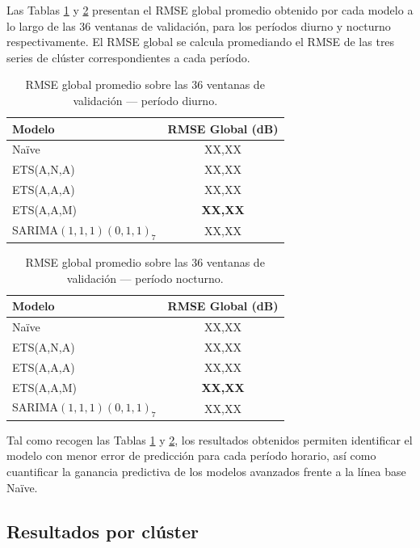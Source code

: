 Las Tablas \ref{tab:rmse_global_day} y \ref{tab:rmse_global_night} presentan el RMSE global promedio obtenido por cada modelo a lo largo de las 36 ventanas de validación, para los períodos diurno y nocturno respectivamente. El RMSE global se calcula promediando el RMSE de las tres series de clúster correspondientes a cada período.

\begin{table}[H]
\centering
\caption{RMSE global promedio sobre las 36 ventanas de validación — período diurno.}
\label{tab:rmse_global_day}
\begin{tabular}{lc}
\toprule
Modelo & RMSE Global (dB) \\
\midrule
Naïve                            & XX{,}XX \\
ETS(A,N,A)                       & XX{,}XX \\
ETS(A,A,A)                       & XX{,}XX \\
ETS(A,A,M)                       & \textbf{XX{,}XX} \\
SARIMA$(1,1,1)(0,1,1)_7$         & XX{,}XX \\
\bottomrule
\end{tabular}
\end{table}

\begin{table}[H]
\centering
\caption{RMSE global promedio sobre las 36 ventanas de validación — período nocturno.}
\label{tab:rmse_global_night}
\begin{tabular}{lc}
\toprule
Modelo & RMSE Global (dB) \\
\midrule
Naïve                            & XX{,}XX \\
ETS(A,N,A)                       & XX{,}XX \\
ETS(A,A,A)                       & XX{,}XX \\
ETS(A,A,M)                       & \textbf{XX{,}XX} \\
SARIMA$(1,1,1)(0,1,1)_7$         & XX{,}XX \\
\bottomrule
\end{tabular}
\end{table}

Tal como recogen las Tablas \ref{tab:rmse_global_day} y \ref{tab:rmse_global_night}, los resultados obtenidos permiten identificar el modelo con menor error de predicción para cada período horario, así como cuantificar la ganancia predictiva de los modelos avanzados frente a la línea base Naïve.

\subsection{Resultados por clúster}
\label{cap5:comparacion:cluster}

